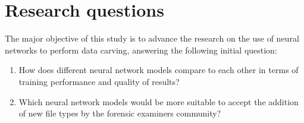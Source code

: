 \section{Research questions}

The major objective of this study is to advance the research on the use of neural networks to perform data carving, answering the following initial question:

\begin{enumerate}[itemindent=\parindent,label=\textbf{Q\arabic*.}]

    \item How does different neural network models compare to each other in terms of training performance and quality of results?
    
    \item Which neural network models would be more suitable to accept the addition of new file types by the forensic examiners community? 

\end{enumerate}
